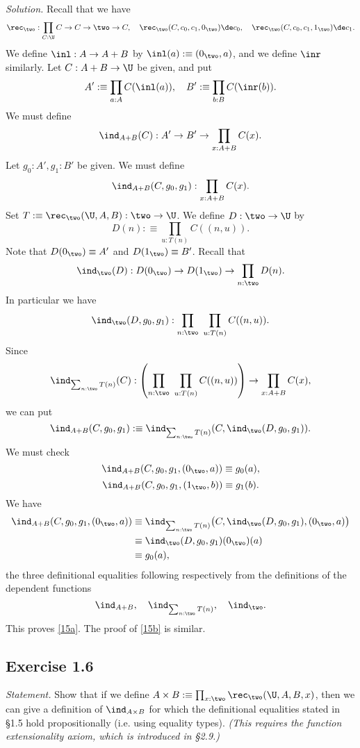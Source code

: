 \documentclass[12pt]{article}
\begin{document}
\nn\emph{Solution.} Recall that we have 
$$
\rec_\two:\prod_{C:\U}C\to C\to\two\to C,\quad\rec_\two(C,c_0,c_1,0_\two)\de c_0,\quad\rec_\two(C,c_0,c_1,1_\two)\de c_1.
$$
We define $\inl:A\to A+B$ by $\inl(a):\equiv(0_\two,a)$, and we define $\inr$ similarly. Let $C:A+B\to\U$ be given, and put 
$$
A':\equiv\prod_{a:A}C(\inl(a)),\quad B':\equiv\prod_{b:B}C(\inr(b)).
$$
We must define 
$$
\ind_{A+B}(C):A'\to B'\to\prod_{x:A+B}C(x).
$$ 
Let $g_0:A',g_1:B'$ be given. We must define 
$$
\ind_{A+B}(C,g_0,g_1):\prod_{x:A+B}C(x).
$$ 
Set $T:\equiv\rec_\two(\U,A,B):\two\to\U$. We define $D:\two\to\U$ by 
$$
D(n):\equiv\prod_{u:T(n)}C((n,u)).
$$ 
Note that $D(0_\two)\equiv A'$ and $D(1_\two)\equiv B'$. Recall that 
$$
\ind_\two(D):D(0_\two)\to D(1_\two)\to\prod_{n:\two}D(n).
$$ 
In particular we have 
$$
\ind_\two(D,g_0,g_1):\prod_{n:\two}\ \prod_{u:T(n)}C((n,u)).
$$ 
Since 
$$
\ind_{\sum_{n:\two}T(n)}(C):\left(\prod_{n:\two}\ \prod_{u:T(n)}C((n,u))\right)\to\prod_{x:A+B}C(x),
$$ 
we can put 
$$
\ind_{A+B}(C,g_0,g_1):\equiv\ind_{\sum_{n:\two}T(n)}(C,\ind_\two(D,g_0,g_1)).
$$ 
We must check 
\begin{equation}\label{15a}
\ind_{A+B}(C,g_0,g_1,(0_\two,a))\equiv g_0(a),
\end{equation}
\begin{equation}\label{15b}
\ind_{A+B}(C,g_0,g_1,(1_\two,b))\equiv g_1(b).
\end{equation} 
We have 
\begin{align*}
\ind_{A+B}(C,g_0,g_1,(0_\two,a))&\equiv\ind_{\sum_{n:\two}T(n)}\big(C,\ind_\two(D,g_0,g_1),(0_\two,a)\big)\\ 
&\equiv\ind_\two(D,g_0,g_1)(0_\two)(a)\\ 
&\equiv g_0(a),
\end{align*}
the three definitional equalities following respectively from the definitions of the dependent functions
$$
\ind_{A+B},\quad\ind_{\sum_{n:\two}T(n)},\quad\ind_\two.
$$ 
This proves \eqref{15a}. The proof of \eqref{15b} is similar.


\subsection{Exercise 1.6}

\emph{Statement.} Show that if we define $A\times B:\equiv\prod_{x:\two}\rec_\two(\U,A,B,x)$, then we can give a definition of  $\ind_{A\times B}$ for which the definitional equalities stated in \S1.5 hold propositionally (i.e. using equality types). \emph{(This requires the function extensionality axiom, which is introduced in \S2.9.)}
\end{document}
